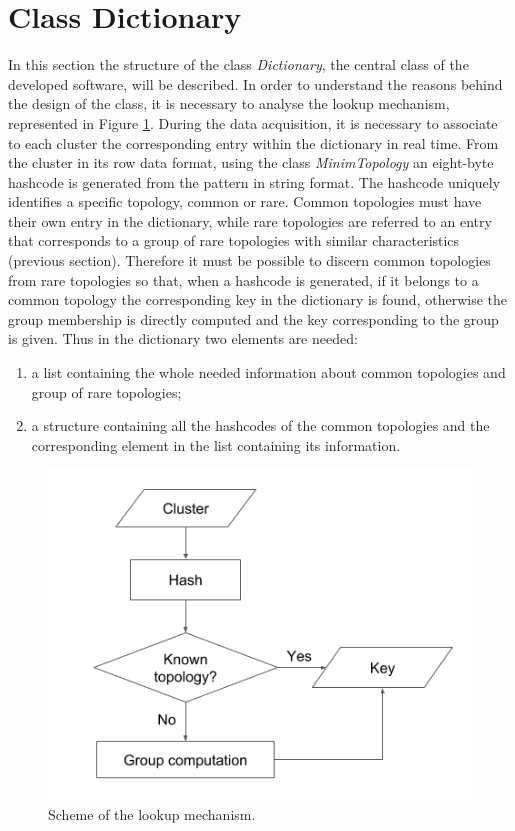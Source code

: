 \section{Class Dictionary}
In this section the structure of the class \textit{Dictionary}, the central class of the developed software, will be described. In order to understand the reasons behind the design of the class, it is necessary to analyse the lookup mechanism, represented in Figure \ref{fig:lucap}. During the data acquisition, it is necessary to associate to each cluster the corresponding entry within the dictionary in real time. From the cluster in its row data format, using the class \textit{MinimTopology} an eight-byte hashcode is generated from the pattern in string format. The hashcode uniquely identifies a specific topology, common or rare.
Common topologies must have their own entry in the dictionary, while rare topologies are referred to an entry that corresponds to a group of rare topologies with similar characteristics (previous section).
Therefore it must be possible to discern common topologies from rare topologies so that, when a hashcode is generated, if it belongs to a common topology the corresponding key in the dictionary is found, otherwise the group membership is directly computed and the key corresponding to the group is given. Thus in the dictionary two elements are needed:
\begin{enumerate}
 \item a list containing the whole needed information about common topologies and group of rare topologies;
 \item a structure containing all the hashcodes of the common topologies and the corresponding element in the list containing its information.
\end{enumerate}
%
\begin{figure}
  \centering
  \includegraphics[scale=0.6]{figures/lucap.png}
  \caption{Scheme of the lookup mechanism.}
  \label{fig:lucap}
\end{figure}
%
